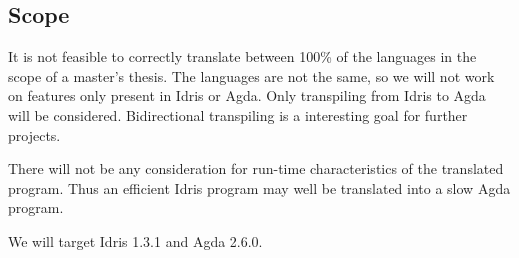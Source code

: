 \subsection{Scope}

It is not feasible to correctly translate between 100\% of the
languages in the scope of a master's thesis.  The languages are not the same,
so we will not work on features only present in Idris or Agda.  Only
transpiling from Idris to Agda will be considered. Bidirectional transpiling is
a interesting goal for further projects.


There will not be any consideration for run-time characteristics of the
translated program.
Thus an efficient Idris program may well be translated into a slow Agda program.

We will target Idris 1.3.1 and Agda 2.6.0.

